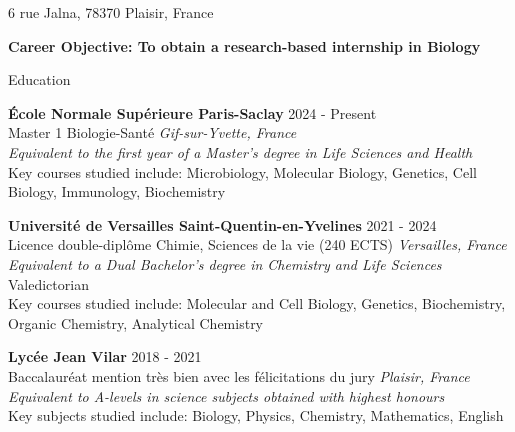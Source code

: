 \documentclass[
	10pt,
]{style} %
\begin{document}
\vspace{-0.25em}

\begin{center}
	6 rue Jalna, 78370 Plaisir, France \\
\end{center}

\begin{center}
	\textbf{Career Objective: To obtain a research-based internship in Biology}
\end{center}


\begin{rSection}{Education}

	\textbf{École Normale Supérieure Paris-Saclay} \hfill 2024 - Present \\
	Master 1 Biologie-Santé \hfill \textit{Gif-sur-Yvette, France} \\
	\textit{Equivalent to the first year of a Master's degree in Life Sciences and Health} \\
	Key courses studied include: Microbiology, Molecular Biology, Genetics, Cell Biology, Immunology, Biochemistry

	\vspace{0.5mm}

	\textbf{Université de Versailles Saint-Quentin-en-Yvelines} \hfill 2021 - 2024 \\
	Licence double-diplôme Chimie, Sciences de la vie (240 ECTS) \hfill \textit{Versailles, France} \\
	\textit{Equivalent to a Dual Bachelor's degree in Chemistry and Life Sciences} \\
	Valedictorian \\
	Key courses studied include: Molecular and Cell Biology, Genetics, Biochemistry, Organic Chemistry, Analytical Chemistry

	\vspace{0.5mm}

	\textbf{Lycée Jean Vilar} \hfill 2018 - 2021 \\
	Baccalauréat mention très bien avec les félicitations du jury \hfill \textit{Plaisir, France} \\
	\textit{Equivalent to A-levels in science subjects obtained with highest honours} \\
	Key subjects studied include: Biology, Physics, Chemistry, Mathematics, English

\end{rSection}
\end{document}
